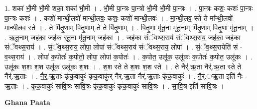 \documentclass[17pt]{extarticle}
\begin{document}
1. शका॑ भौ॒मी भौ॒मी शका॒ शका॑ भौ॒मी । . भौ॒मी पा॒न्त्रः पा॒न्त्रो भौ॒मी भौ॒मी पा॒न्त्रः । . पा॒न्त्रः कशः॒ कशः॑ पा॒न्त्रः पा॒न्त्रः कशः॑ । . कशो॑ मान्थी॒लवो॑ मान्थी॒लवः॒ कशः॒ कशो॑ मान्थी॒लवः॑ । . मा॒न्थी॒लव॒ स्ते ते मा᳚न्थी॒लवो॑ मान्थी॒लव॒ स्ते । . ते पि॑तृ॒णाम् पि॑तृ॒णाम् ते ते पि॑तृ॒णाम् । . पि॒तृ॒णा मृ॑तू॒ना मृ॑तू॒नाम् पि॑तृ॒णाम् पि॑तृ॒णा मृ॑तू॒नाम् । . ऋ॒तू॒नाम् जह॑का॒ जह॑क र्‌तू॒ना मृ॑तू॒नाम् जह॑का । . जह॑का संॅवथ्स॒राय॑ संॅवथ्स॒राय॒ जह॑का॒ जह॑का संॅवथ्स॒राय॑ । . सं॒ॅव॒थ्स॒राय॒ लोपा॒ लोपा॑ संॅवथ्स॒राय॑ संॅवथ्स॒राय॒ लोपा᳚ । . सं॒ॅव॒थ्स॒रायेति॑ सं - व॒थ्स॒राय॑ । . लोपा॑ क॒पोतः॑ क॒पोतो॒ लोपा॒ लोपा॑ क॒पोतः॑ । . क॒पोत॒ उलू॑क॒ उलू॑कः क॒पोतः॑ क॒पोत॒ उलू॑कः । . उलू॑कः श॒शः श॒श उलू॑क॒ उलू॑कः श॒शः । . श॒श स्ते ते श॒शः श॒श स्ते । . ते नैर्॑.ऋ॒ता नैर्॑.ऋ॒ता स्ते ते नैर्॑.ऋ॒ताः । . नै॒र्॒.ऋ॒ताः कृ॑क॒वाकुः॑ कृक॒वाकु॑र् नैर्.ऋ॒ता नैर्॑.ऋ॒ताः कृ॑क॒वाकुः॑ । . नै॒र्.॒ऋ॒ता इति॑ नैः - ऋ॒ताः । . कृ॒क॒वाकुः॑ सावि॒त्रः सा॑वि॒त्रः कृ॑क॒वाकुः॑ कृक॒वाकुः॑ सावि॒त्रः । . सा॒वि॒त्र इति॑ सावि॒त्रः । \newline

\textbf{Ghana Paata } \newline
\end{document}
